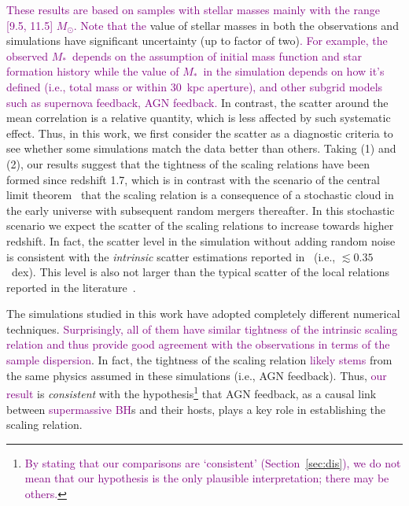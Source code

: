 \documentclass[twocolumn]{aastex631}
\newcommand{\todo}[1]{\textcolor{red}{[{\bf TODO}: #1]}}
\newcommand{\red}[1]{\textcolor{purple}{#1}}
\def\smass{{$M_*$}}
\begin{document}
\red{These results are based on samples with stellar masses mainly with the range [9.5, 11.5] $M_{\odot}$. Note that
the} value of stellar masses in both the observations and simulations have significant uncertainty (up to factor of two)\red{. For example, the observed \smass\ depends on the assumption of initial mass function and star formation history while the value of \smass\ in the simulation depends on how it's defined (i.e., total mass or within 30~kpc aperture), and other subgrid models such as supernova feedback, AGN feedback.} In contrast, the scatter around the mean correlation is a relative quantity, which is less affected by such systematic effect. Thus, in this work, we first consider the scatter as a diagnostic criteria to see whether some simulations match the data better than others. Taking (1) and (2), our results suggest that the tightness of the scaling relations have been formed since redshift 1.7, which is in contrast with the scenario of the central limit theorem~\citep{Peng2007, Jahnke2011, Hirschmann2010} that the scaling relation is a consequence of a stochastic cloud in the early universe with subsequent random mergers thereafter. In this stochastic scenario we expect the scatter of the scaling relations to increase towards higher redshift. In fact, the scatter level in the simulation without adding random noise is consistent with the {\it intrinsic} scatter estimations reported in~\citet{Ding2020,Li2021b} (i.e., $\lesssim0.35$~dex). This level is also not larger than the typical scatter of the local relations reported in the literature~\citep{Kormendy13, Gul++09, Reines2015}.

The simulations studied in this work have adopted completely different numerical techniques. \red{Surprisingly, all of them have similar tightness of the intrinsic scaling relation and thus provide good agreement with the observations in terms of the sample dispersion}. In fact, the tightness of the scaling relation \red{likely stems} from the same physics assumed in these simulations (i.e., AGN feedback). Thus, \red{our result} is {\it consistent} with the hypothesis\footnote{\red{By stating that our comparisons are `consistent' (Section~\ref{sec:dis}), we do not mean that our hypothesis is the only plausible interpretation; there may be others.}} that AGN feedback, as a causal link between \red{supermassive BH}s and their hosts, plays a key role in establishing the scaling relation. 
\end{document}
